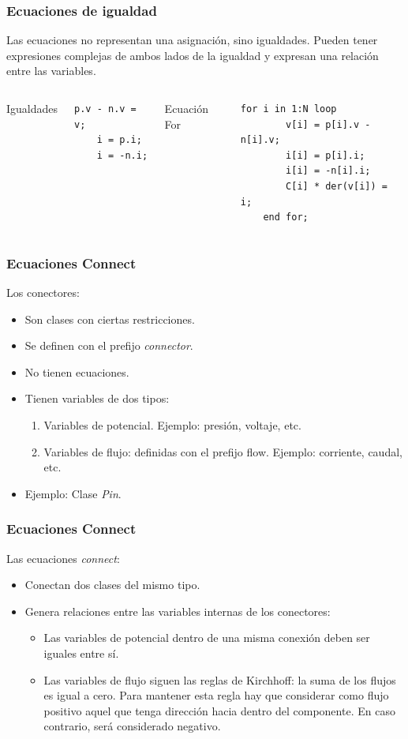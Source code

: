 \documentclass[aspectratio=169,10pt]{beamer}
\begin{document}
\begin{frame}[fragile]
\frametitle{Ecuaciones de igualdad} 

Las ecuaciones no representan una asignación, sino igualdades. Pueden tener expresiones complejas de ambos lados de la igualdad y expresan una relación entre las variables. 

\begin{columns}  
\column[t]{8cm}
Igualdades
\begin{lstlisting}[style=base]
    p.v - n.v = v;
    i = p.i;
    i = -n.i;
\end{lstlisting} 
\column[t]{5cm}
Ecuación For
\begin{lstlisting}[style=base]
    for i in 1:N loop
        v[i] = p[i].v - n[i].v;
        i[i] = p[i].i;
        i[i] = -n[i].i;
        C[i] * der(v[i]) = i;
    end for;
\end{lstlisting} 
\end{columns}


\end{frame}

\begin{frame}[fragile]
\frametitle{Ecuaciones Connect} 
Los conectores:
\begin{itemize}
\item Son clases con ciertas restricciones.
\item Se definen con el prefijo \textit{connector}.
\item No tienen ecuaciones.
\item Tienen variables de dos tipos:
    \begin{enumerate}
        \item Variables de potencial. Ejemplo: presión, voltaje, etc. 
        \item Variables de flujo: definidas con el prefijo flow. Ejemplo: corriente, caudal, etc.
    \end{enumerate}
\item Ejemplo: Clase \textit{Pin}.
\end{itemize}

\end{frame}

\begin{frame}[fragile]
\frametitle{Ecuaciones Connect} 
Las ecuaciones \textit{connect}: 
\begin{itemize}
\item Conectan dos clases del mismo tipo.
\item Genera relaciones entre las variables internas de los conectores:
\begin{itemize}
\item Las variables de potencial dentro de una misma conexión deben ser iguales entre sí.
\item Las variables de flujo siguen las reglas de Kirchhoff: la suma de los flujos es igual a cero. Para mantener esta regla hay que considerar como flujo positivo aquel que tenga dirección hacia dentro del componente. En caso contrario, será considerado negativo. 
\end{itemize}
\end{itemize}
\end{frame}
\end{document}
